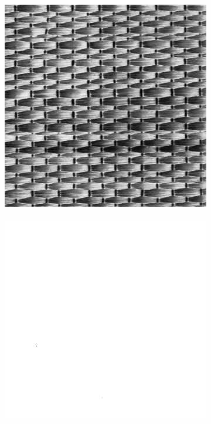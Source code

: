 \begin{figure}
\begin{subfigure}[b]{.25\textwidth}
    \end{subfigure}
    \\
    \vspace{1em}
    \begin{subfigure}[b]{.25\textwidth}
        \centering
        \includegraphics[width=\textwidth]{contenu/resources/images/lattice2}
    \end{subfigure}
    \hspace{1em}
    \begin{subfigure}[b]{.25\textwidth}
        \centering
        \includegraphics[width=\textwidth]{contenu/resources/images/lattice2_filtered}
    \end{subfigure}


\end{figure}

